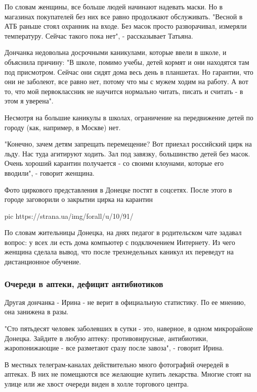 По словам женщины, все больше людей начинают надевать маски. Но в магазинах
покупателей без них все равно продолжают обслуживать. "Весной в АТБ раньше
стоял охранник на входе. Без масок просто разворачивал, измеряли температуру.
Сейчас такого пока нет", - рассказывает Татьяна.

Дончанка недовольна досрочными каникулами, которые ввели в школе, и объяснила
причину: "В школе, помимо учебы, детей кормят и они находятся там под
присмотром. Сейчас они сидят дома весь день в планшетах. Но гарантии, что они
не заболеют, все равно нет, потому что мы с мужем ходим на работу. А вот то,
что мой первоклассник не научится нормально читать, писать и считать - в этом я
уверена". 

Несмотря на большие каникулы в школах, ограничение на передвижение детей по
городу (как, например, в Москве) нет.

"Конечно, зачем детям запрещать перемещение? Вот приехал российский цирк на
льду. Нас туда агитируют ходить. Зал под завязку, большинство детей без масок.
Очень хороший карантин получается - со своими клоунами, которые его вводили", -
говорит женщина.

Фото циркового представления в Донецке постят в соцсетях. После этого в городе
заговорили о закрытии цирка на карантин

\ifcmt
pic https://strana.ua/img/forall/u/10/91/%
\fi

По словам жительницы Донецка, на днях педагог в родительском чате задавал
вопрос: у всех ли есть дома компьютер с подключением Интернету. Из чего женщина
сделала вывод, что после трехнедельных каникул их переведут на дистанционное
обучение. 

\subsubsection{Очереди в аптеки, дефицит антибиотиков}

Другая дончанка - Ирина - не верит в официальную статистику. По ее мнению, она
занижена в разы.

"Сто пятьдесят человек заболевших в сутки - это, наверное, в одном микрорайоне
Донецка. Зайдите в любую аптеку: противовирусные, антибиотики, жаропонижающие -
все разметают сразу после завоза", - говорит Ирина.

В местных телеграм-каналах действительно много фотографий очередей в аптеках. В
них не помещаются все желающие купить лекарства. Многие стоят на улице или же
хвост очереди виден в холле торгового центра.

